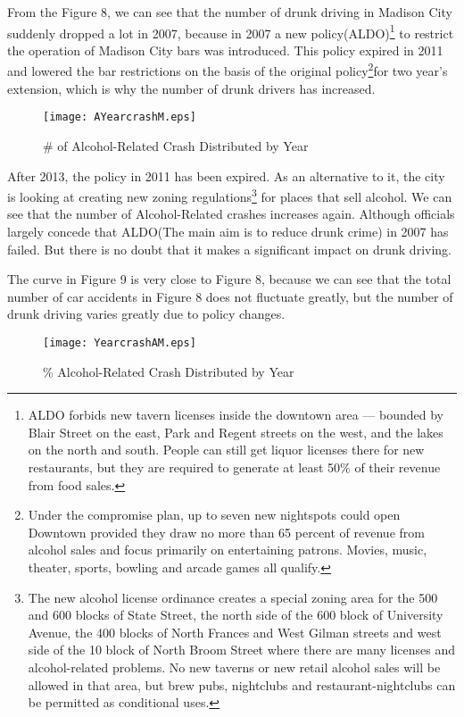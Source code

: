 \documentclass[15pt]{article}
\begin{document}
\newpage
From the Figure 8, we can see that the number of drunk driving in Madison City suddenly dropped a lot in 2007, because in 2007 a new policy(ALDO)\footnote{ALDO forbids new tavern licenses inside the downtown area — bounded by Blair Street on the east, Park and Regent streets on the west, and the lakes on the north and south. People can still get liquor licenses there for new restaurants, but they are required to generate at least 50\% of their revenue from food sales.} to restrict the operation of Madison City bars was introduced. This policy expired in 2011 and lowered the bar restrictions on the basis of the original policy\footnote{Under the compromise plan, up to seven new nightspots could open Downtown provided they draw no more than 65 percent of revenue from alcohol sales and focus primarily on entertaining patrons. Movies, music, theater, sports, bowling and arcade games all qualify.}for two year's extension, which is why the number of drunk drivers has increased.
\begin{figure}[H]
\flushleft
\texttt{[image: AYearcrashM.eps]}
\caption{\# of Alcohol-Related Crash Distributed by Year}
\end{figure}
After 2013, the policy in 2011 has been expired. As an alternative to it, the city is looking at creating new zoning regulations\footnote{The new alcohol license ordinance creates a special zoning area for the 500 and 600 blocks of State Street, the north side of the 600 block of University Avenue, the 400 blocks of North Frances and West Gilman streets and west side of the 10 block of North Broom Street where there are many licenses and alcohol-related problems. No new taverns or new retail alcohol sales will be allowed in that area, but brew pubs, nightclubs and restaurant-nightclubs can be permitted as conditional uses.} for places that sell alcohol. We can see that the number of Alcohol-Related crashes increases again. Although officials largely concede that ALDO(The main aim is to reduce drunk crime) in 2007 has failed. But there is no doubt that it makes a significant impact on drunk driving.

\newpage
The curve in Figure 9 is very close to Figure 8, because we can see that the total number of car accidents in Figure 8 does not fluctuate greatly, but the number of drunk driving varies greatly due to policy changes.
\begin{figure}[H]
\flushleft
\texttt{[image: YearcrashAM.eps]}
\caption{\% Alcohol-Related Crash Distributed by Year}
\end{figure}
\end{document}
